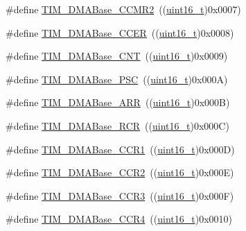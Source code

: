 \begin{DoxyCompactItemize}
\#define \hyperlink{group___t_i_m___d_m_a___base__address_ga4989f74592ab359f30bd7c4a4a457571}{T\+I\+M\+\_\+\+D\+M\+A\+Base\+\_\+\+C\+C\+M\+R2}~((\hyperlink{_p_e___types_8h_a1f1825b69244eb3ad2c7165ddc99c956}{uint16\+\_\+t})0x0007)
\item 
\#define \hyperlink{group___t_i_m___d_m_a___base__address_ga6935639db5738662520e8d0eb7116dd6}{T\+I\+M\+\_\+\+D\+M\+A\+Base\+\_\+\+C\+C\+ER}~((\hyperlink{_p_e___types_8h_a1f1825b69244eb3ad2c7165ddc99c956}{uint16\+\_\+t})0x0008)
\item 
\#define \hyperlink{group___t_i_m___d_m_a___base__address_gacab604257d144cf3a59b360cbc958ec9}{T\+I\+M\+\_\+\+D\+M\+A\+Base\+\_\+\+C\+NT}~((\hyperlink{_p_e___types_8h_a1f1825b69244eb3ad2c7165ddc99c956}{uint16\+\_\+t})0x0009)
\item 
\#define \hyperlink{group___t_i_m___d_m_a___base__address_gab8dd06970f235fe9f6997e0975237388}{T\+I\+M\+\_\+\+D\+M\+A\+Base\+\_\+\+P\+SC}~((\hyperlink{_p_e___types_8h_a1f1825b69244eb3ad2c7165ddc99c956}{uint16\+\_\+t})0x000\+A)
\item 
\#define \hyperlink{group___t_i_m___d_m_a___base__address_gaab8a66f70e59b5916b4bba344746d652}{T\+I\+M\+\_\+\+D\+M\+A\+Base\+\_\+\+A\+RR}~((\hyperlink{_p_e___types_8h_a1f1825b69244eb3ad2c7165ddc99c956}{uint16\+\_\+t})0x000\+B)
\item 
\#define \hyperlink{group___t_i_m___d_m_a___base__address_ga97f9edceee5c99b32aaa2c6daf849b7d}{T\+I\+M\+\_\+\+D\+M\+A\+Base\+\_\+\+R\+CR}~((\hyperlink{_p_e___types_8h_a1f1825b69244eb3ad2c7165ddc99c956}{uint16\+\_\+t})0x000\+C)
\item 
\#define \hyperlink{group___t_i_m___d_m_a___base__address_ga235a47fa47fd19594a111e6e48c0d5a2}{T\+I\+M\+\_\+\+D\+M\+A\+Base\+\_\+\+C\+C\+R1}~((\hyperlink{_p_e___types_8h_a1f1825b69244eb3ad2c7165ddc99c956}{uint16\+\_\+t})0x000\+D)
\item 
\#define \hyperlink{group___t_i_m___d_m_a___base__address_ga0e2150dcd3afe31ecb793aa471b3b972}{T\+I\+M\+\_\+\+D\+M\+A\+Base\+\_\+\+C\+C\+R2}~((\hyperlink{_p_e___types_8h_a1f1825b69244eb3ad2c7165ddc99c956}{uint16\+\_\+t})0x000\+E)
\item 
\#define \hyperlink{group___t_i_m___d_m_a___base__address_ga590c90085bd2b206b941dff2731fed74}{T\+I\+M\+\_\+\+D\+M\+A\+Base\+\_\+\+C\+C\+R3}~((\hyperlink{_p_e___types_8h_a1f1825b69244eb3ad2c7165ddc99c956}{uint16\+\_\+t})0x000\+F)
\item 
\#define \hyperlink{group___t_i_m___d_m_a___base__address_ga5e84a16e7d8ea369a3a55bb6fe1f2171}{T\+I\+M\+\_\+\+D\+M\+A\+Base\+\_\+\+C\+C\+R4}~((\hyperlink{_p_e___types_8h_a1f1825b69244eb3ad2c7165ddc99c956}{uint16\+\_\+t})0x0010)

\end{DoxyCompactItemize}
